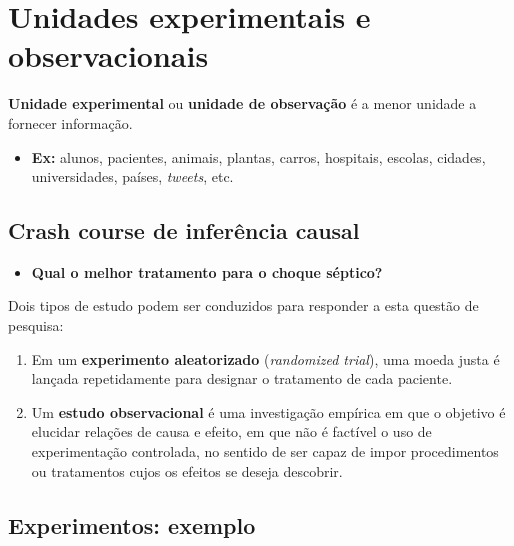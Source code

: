 \documentclass[]{tufte-book}
\providecommand{\tightlist}{%
  \setlength{\itemsep}{0pt}\setlength{\parskip}{0pt}}
\begin{document}
\hypertarget{unidades-experimentais-e-observacionais}{%
\section{Unidades experimentais e
observacionais}\label{unidades-experimentais-e-observacionais}}

\textbf{Unidade experimental} ou \textbf{unidade de observação} é a
menor unidade a fornecer informação.

\begin{itemize}
\tightlist
\item
  \textbf{Ex:} alunos, pacientes, animais, plantas, carros, hospitais,
  escolas, cidades, universidades, países, \emph{tweets}, etc.
\end{itemize}

\hypertarget{crash-course-de-inferuxeancia-causal}{%
\subsection{Crash course de inferência
causal}\label{crash-course-de-inferuxeancia-causal}}

\begin{itemize}
\tightlist
\item
  \textbf{Qual o melhor tratamento para o choque séptico?}
\end{itemize}

Dois tipos de estudo podem ser conduzidos para responder a esta questão
de pesquisa:

\begin{enumerate}
\def\labelenumi{\arabic{enumi}.}
\tightlist
\item
  Em um \textbf{experimento aleatorizado} (\emph{randomized trial}), uma
  moeda justa é lançada repetidamente para designar o tratamento de cada
  paciente.
\item
  Um \textbf{estudo observacional} é uma investigação empírica em que o
  objetivo é elucidar relações de causa e efeito, em que não é factível
  o uso de experimentação controlada, no sentido de ser capaz de impor
  procedimentos ou tratamentos cujos os efeitos se deseja descobrir.
\end{enumerate}

\hypertarget{experimentos-exemplo}{%
\subsection{Experimentos: exemplo}\label{experimentos-exemplo}}
\end{document}
